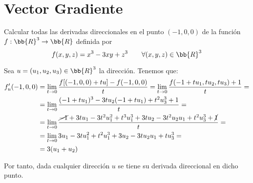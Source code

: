 \section{Vector Gradiente}

\begin{ejercicio}
    Calcular todas las derivadas direccionales en el punto $(-1,0,0)$ de la función $f:\bb{R}^3\to \bb{R}$ definida por
    \begin{equation*}
        f(x,y,z) = x^3  -3xy + z^3 \qquad \forall (x,y,z)\in \bb{R}^3
    \end{equation*}

    Sea $u=(u_1,u_2,u_3)\in \bb{R}^3$ la dirección. Tenemos que:
    \begin{equation*}\begin{split}
        f'_u(-1,0,0) &= \lim_{t\to 0} \frac{f[(-1,0,0) + tu] - f(-1,0,0)}{t}
        = \lim_{t\to 0} \frac{f(-1+tu_1, tu_2, tu_3) +1}{t}
        =\\&= \lim_{t\to 0} \frac{(-1+tu_1)^3-3tu_2(-1+tu_1) + t^2u_3^3 +1}{t}
        =\\&= \lim_{t\to 0} \frac{\cancel{-1}+3tu_1 - 3t^2u_1^2 +t^3u_1^3 +3tu_2 -3t^2u_2u_1 + t^2u_3^3 +\cancel{1}}{t}
        =\\&= \lim_{t\to 0} 3u_1 - 3tu_1^2 +t^2u_1^3 +3u_2 -3tu_2u_1 + tu_3^3
        =\\&= 3(u_1 + u_2)
    \end{split}\end{equation*}

    Por tanto, dada cualquier dirección $u$ se tiene su derivada direccional en dicho punto.
\end{ejercicio}

